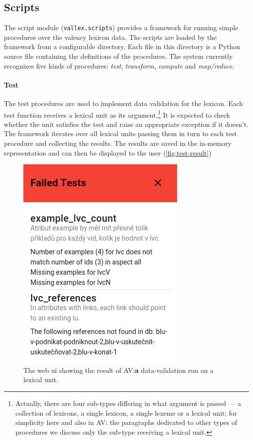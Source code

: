 \documentclass[10pt, a4paper]{article}
\newcommand{\py}[1]{{\tt #1}}
\newcommand{\av}[1]{{\color{ansa} AV: #1}}
\newcommand{\avout}[2][]{{\color{ansa} AV:}{\color{lightgray}\textbf{#2}} {\color{ansa} #1}}
\begin{document}
\subsection{Scripts}
The script module (\py{vallex.scripts}) provides a framework for running simple procedures over the
valency lexicon data. The scripts are loaded by the framework from a configurable directory. Each
file in this directory is a Python source file containing the definitions of the procedures.
The system currently recognizes five kinds of procedures: \emph{test}, \emph{transform}, \emph{compute} and \emph{map/reduce}.

\paragraph{Test} The test procedures are used to implement data validation for the lexicon. Each test
function receives a lexical unit as its argument.\footnote{Actually, there are four sub-types differing in what
argument is passed --- a collection of lexicons, a single lexicon, a single lexeme or a lexical unit; for simplicity here and also in \av{the paragraphs dedicated to} other types of procedures we discuss only the sub-type receiving a lexical unit.} It is expected
to check whether the unit satisfies the test and raise an appropriate exception if it doesn't. The framework
iterates over all lexical units passing them in turn to each test procedure and collecting the results. The
results are saved in the in-memory representation and can then be displayed to the user (\autoref{fig:test-result})
\begin{figure}
    \includegraphics[width=0.8\hsize]{images/test-result.png}
    \caption{\label{fig:test-result}The web ui showing the result of \avout{a} data-validation run on a lexical unit.}
\end{figure}
\end{document}
